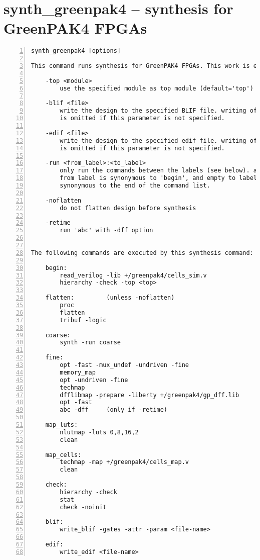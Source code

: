 \section{synth\_greenpak4 -- synthesis for GreenPAK4 FPGAs}
\label{cmd:synth_greenpak4}
\begin{lstlisting}[numbers=left,frame=single]
    synth_greenpak4 [options]

This command runs synthesis for GreenPAK4 FPGAs. This work is experimental.

    -top <module>
        use the specified module as top module (default='top')

    -blif <file>
        write the design to the specified BLIF file. writing of an output file
        is omitted if this parameter is not specified.

    -edif <file>
        write the design to the specified edif file. writing of an output file
        is omitted if this parameter is not specified.

    -run <from_label>:<to_label>
        only run the commands between the labels (see below). an empty
        from label is synonymous to 'begin', and empty to label is
        synonymous to the end of the command list.

    -noflatten
        do not flatten design before synthesis

    -retime
        run 'abc' with -dff option


The following commands are executed by this synthesis command:

    begin:
        read_verilog -lib +/greenpak4/cells_sim.v
        hierarchy -check -top <top>

    flatten:         (unless -noflatten)
        proc
        flatten
        tribuf -logic

    coarse:
        synth -run coarse

    fine:
        opt -fast -mux_undef -undriven -fine
        memory_map
        opt -undriven -fine
        techmap
        dfflibmap -prepare -liberty +/greenpak4/gp_dff.lib
        opt -fast
        abc -dff     (only if -retime)

    map_luts:
        nlutmap -luts 0,8,16,2
        clean

    map_cells:
        techmap -map +/greenpak4/cells_map.v
        clean

    check:
        hierarchy -check
        stat
        check -noinit

    blif:
        write_blif -gates -attr -param <file-name>

    edif:
        write_edif <file-name>
\end{lstlisting}

